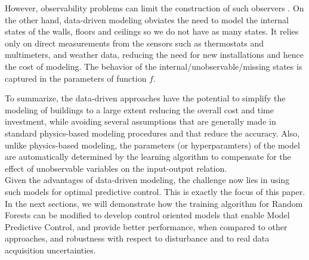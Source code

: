 \begin{enumerate}
{	However, observability problems can limit the construction of such observers \cite{Dorf2011MCS}. 
	On the other hand, data-driven modeling obviates the need to model the internal states of the walls, floors and ceilings so we do not have as many states. 
	It relies only on direct measurements from the sensors such as thermostats and multimeters, and weather data, reducing the need for new installations and hence the cost of modeling.
	The behavior of the internal/unobservable/missing states is captured in the parameters of function \(f\).
}
\end{enumerate}

\textcolor[rgb]{0,0,1}{
	To summarize, the data-driven approaches have the potential to simplify the modeling of buildings to a large extent reducing the overall cost and time investment, while avoiding several assumptions that are generally made in standard physics-based modeling procedures and that reduce the accuracy. 
	Also, unlike physics-based modeling, the parameters (or hyperparamters) of the model are automatically determined by the learning algorithm to compensate for the effect of unobservable variables on the input-output relation.\\
	Given the advantages of data-driven modeling, the challenge now lies in using such models for optimal predictive control.
	This is exactly the focus of this paper. 
	In the next sections, we will demonstrate how the training algorithm for Random Forests can be modified to develop control oriented models that enable Model Predictive Control, and provide better performance, when compared to other approaches, and robustness with respect to disturbance and to real data acquisition uncertainties.}